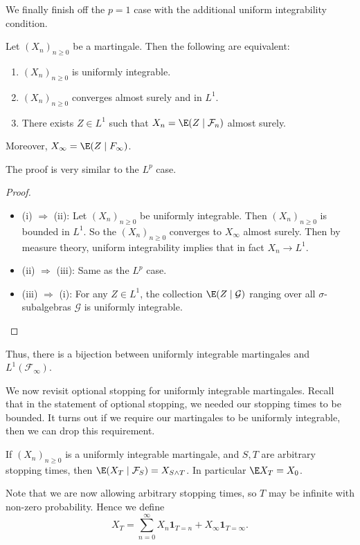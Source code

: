 \documentclass[a4paper]{article}
\begin{document}
We finally finish off the $p = 1$ case with the additional uniform integrability condition.
\begin{thm}[Convergence in $L^1$]
  Let $(X_n)_{n \geq 0}$ be a martingale. Then the following are equivalent:
  \begin{enumerate}
    \item $(X_n)_{n \geq 0}$ is uniformly integrable.
    \item $(X_n)_{n \geq 0}$ converges almost surely and in $L^1$.
    \item There exists $Z \in L^1$ such that $X_n = \E(Z \mid \mathcal{F}_n)$ almost surely.
  \end{enumerate}
  Moreover, $X_\infty = \E(Z \mid F_\infty)$.
\end{thm}

The proof is very similar to the $L^p$ case.
\begin{proof}\leavevmode
  \begin{itemize}
    \item (i) $\Rightarrow$ (ii): Let $(X_n)_{n \geq 0}$ be uniformly integrable. Then $(X_n)_{n \geq 0}$ is bounded in $L^1$. So the $(X_n)_{n \geq 0}$ converges to $X_\infty$ almost surely. Then by measure theory, uniform integrability implies that in fact $X_n \to L^1$.
    \item (ii) $\Rightarrow$ (iii): Same as the $L^p$ case.
    \item (iii) $\Rightarrow$ (i): For any $Z \in L^1$, the collection $\E(Z \mid \mathcal{G})$ ranging over all $\sigma$-subalgebras $\mathcal{G}$ is uniformly integrable.
  \end{itemize}
\end{proof}
Thus, there is a bijection between uniformly integrable martingales and $L^1(\mathcal{F}_\infty)$.

We now revisit optional stopping for uniformly integrable martingales. Recall that in the statement of optional stopping, we needed our stopping times to be bounded. It turns out if we require our martingales to be uniformly integrable, then we can drop this requirement.

\begin{thm}
  If $(X_n)_{n \geq 0}$ is a uniformly integrable martingale, and $S, T$ are arbitrary stopping times, then $\E(X_T \mid \mathcal{F}_S) = X_{S \wedge T}$. In particular $\E X_T = X_0$.
\end{thm}
Note that we are now allowing arbitrary stopping times, so $T$ may be infinite with non-zero probability. Hence we define
\[
  X_T = \sum_{n = 0}^\infty X_n \mathbf{1}_{T = n} + X_\infty \mathbf{1}_{T = \infty}.
\]
\end{document}

